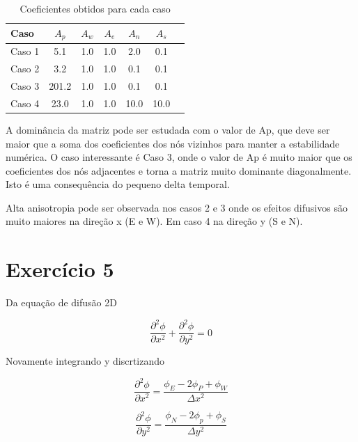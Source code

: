 \documentclass[]{article}
\begin{document}
	
	\begin{table}[h!]
		\centering
		\begin{tabular}{@{}lcccccc@{}}
			\toprule
			\textbf{Caso} & \textbf{$A_p$} & \textbf{$A_w$} & \textbf{$A_e$} & \textbf{$A_n$} & \textbf{$A_s$} \\ \midrule
			Caso 1        & 5.1            & 1.0            & 1.0            & 2.0            & 0.1            \\
			Caso 2        & 3.2            & 1.0            & 1.0            & 0.1            & 0.1            \\
			Caso 3        & 201.2          & 1.0            & 1.0            & 0.1            & 0.1            \\
			Caso 4        & 23.0           & 1.0            & 1.0            & 10.0           & 10.0           \\ \bottomrule
		\end{tabular}
		\caption{Coeficientes obtidos para cada caso}
		\label{tab:coeficientes}
	\end{table}

A dominância da matriz pode ser estudada com o valor de Ap, que deve ser maior que a soma dos coeficientes dos nós vizinhos para manter a estabilidade numérica. O caso interessante é Caso 3, onde o valor de Ap é muito maior que os coeficientes dos nós adjacentes e torna a matriz muito dominante diagonalmente. Isto é uma consequência do pequeno delta temporal.

Alta anisotropia pode ser observada nos casos 2 e 3 onde os efeitos difusivos são muito maiores na direção x (E e W). Em caso 4 na direção y (S e N).


\section*{Exercício 5}

Da equação de difusão 2D

\begin{equation}
	\frac{\partial^2 \phi}{\partial x^2} + \frac{\partial^2 \phi}{\partial y^2} = 0
\end{equation}

Novamente integrando y discrtizando

\begin{equation}
	\frac{\partial^2 \phi}{\partial x^2} = \frac{\phi_{E} - 2\phi_{P} + \phi_{W}}{\Delta x^2}
\end{equation}

\begin{equation}
	\frac{\partial^2 \phi}{\partial y^2} = \frac{\phi_{N} - 2\phi_{p} + \phi_{S}}{\Delta y^2}
\end{equation}
\end{document}
